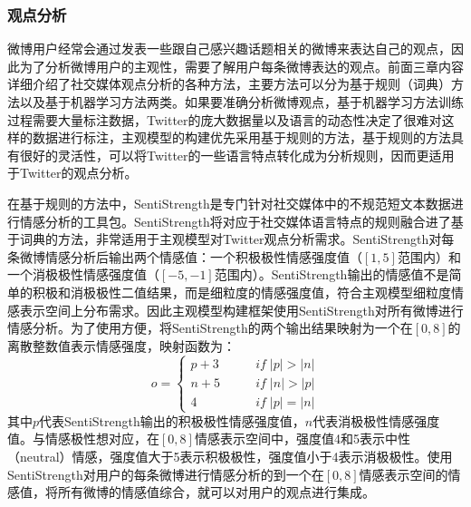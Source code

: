 \subsubsection{观点分析}
\label{sentiment}
微博用户经常会通过发表一些跟自己感兴趣话题相关的微博来表达自己的观点，因此为了分析微博用户的主观性，需要了解用户每条微博表达的观点。前面三章内容详细介绍了社交媒体观点分析的各种方法，主要方法可以分为基于规则（词典）方法以及基于机器学习方法两类。如果要准确分析微博观点，基于机器学习方法训练过程需要大量标注数据，Twitter的庞大数据量以及语言的动态性决定了很难对这样的数据进行标注，主观模型的构建优先采用基于规则的方法，基于规则的方法具有很好的灵活性，可以将Twitter的一些语言特点转化成为分析规则，因而更适用于Twitter的观点分析。

在基于规则的方法中，SentiStrength是专门针对社交媒体中的不规范短文本数据进行情感分析的工具包。SentiStrength将对应于社交媒体语言特点的规则融合进了基于词典的方法，非常适用于主观模型对Twitter观点分析需求。SentiStrength对每条微博情感分析后输出两个情感值：一个积极极性情感强度值（$ [1,5] $范围内）和一个消极极性情感强度值（$ [-5,-1] $范围内）。SentiStrength输出的情感值不是简单的积极和消极极性二值结果，而是细粒度的情感强度值，符合主观模型细粒度情感表示空间上分布需求。因此主观模型构建框架使用SentiStrength对所有微博进行情感分析。为了使用方便，将SentiStrength的两个输出结果映射为一个在$ [0, 8] $的离散整数值表示情感强度，映射函数为：
\begin{equation}
\label{opinionmap}
o=\begin{cases} 
{p+3} &  \qquad if \; \vert p \vert > \vert n \vert \\
{n+5} &  \qquad if \; \vert n \vert > \vert p \vert \\
{4}  &   \qquad if \; \vert p \vert = \vert n \vert
\end{cases}
\end{equation}
其中$ p $代表SentiStrength输出的积极极性情感强度值，$ n $代表消极极性情感强度值。与情感极性想对应，在$ [0, 8] $情感表示空间中，强度值4和5表示中性（neutral）情感，强度值大于5表示积极极性，强度值小于4表示消极极性。使用SentiStrength对用户的每条微博进行情感分析的到一个在$ [0, 8] $情感表示空间的情感值，将所有微博的情感值综合，就可以对用户的观点进行集成。

